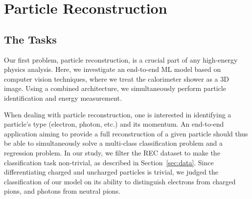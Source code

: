\chapter{Particle Reconstruction}
\label{sec:reco}

\section{The Tasks}

Our first problem, particle reconstruction, is a crucial part of any high-energy physics analysis. Here, we investigate an end-to-end ML model based on computer vision techniques, where we treat the calorimeter shower as a 3D image. Using a combined architecture, we simultaneously perform particle identification and energy measurement.

When dealing with particle reconstruction, one is interested in identifying a particle's type (electron, photon, etc.) and its momentum. An end-to-end application aiming to provide a full reconstruction of a given particle should thus be able to simultaneously solve a multi-class classification problem and a regression problem. In our study, we filter the REC dataset to make the classification task non-trivial, as described in Section~\ref{sec:data}. Since differentiating charged and uncharged particles is trivial, we judged the classification of our model on its ability to distinguish electrons from charged pions, and photons from neutral pions.

